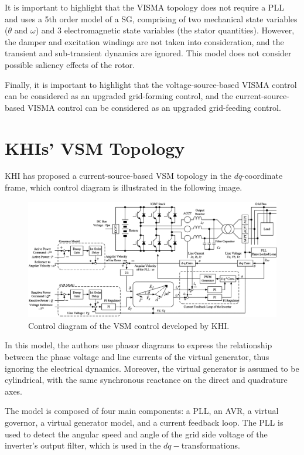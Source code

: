 It is important to highlight that the VISMA topology does not require a PLL and
uses a 5th order model of a SG, comprising of two mechanical state variables
($\theta$ and $\omega$) and 3 electromagnetic state variables (the stator
quantities). However, the damper and excitation windings are not taken into
consideration, and the transient and sub-transient dynamics are ignored.
This model does not consider possible saliency effects of the rotor.

Finally, it is important to highlight that the voltage-source-based VISMA
control can be considered as an upgraded grid-forming control, and the
current-source-based VISMA control can be considered as an upgraded grid-feeding
control.

\section{KHIs' VSM Topology}\label{sec:KHI}
KHI has proposed a current-source-based VSM topology in the $dq$-coordinate
frame\cite{hirase2013grid}, which control diagram is illustrated in the
following image.

\begin{figure}[ht!]
    \centering
    \includegraphics[width=14cm]{images/KHI.png}
    \caption{Control diagram of the VSM control developed by KHI\cite{hirase2013grid}.}
    \label{fig:KHI}
\end{figure}

In this model, the authors use phasor diagrams to express the relationship
between the phase voltage and line currents of the virtual generator, thus
ignoring the electrical dynamics. Moreover, the virtual generator is assumed to
be cylindrical, with the same synchronous reactance on the direct and quadrature
axes.

The model is composed of four main components: a PLL, an AVR, a virtual
governor, a virtual generator model, and a current feedback loop. The PLL is
used to detect the angular speed and angle of the grid side voltage of the
inverter's output filter, which is used in the $dq-$transformations.

